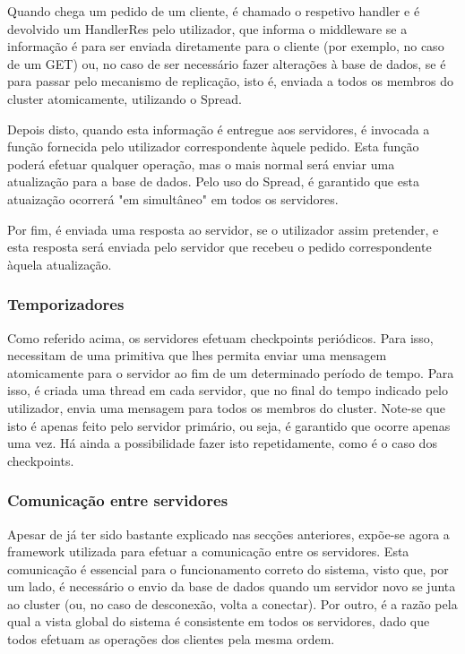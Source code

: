 \documentclass[a4paper]{report}
\begin{document}
{				Quando chega um pedido de um cliente, é chamado o respetivo handler e é devolvido um HandlerRes pelo utilizador, que informa o middleware se a informação é para ser enviada diretamente para o cliente (por exemplo, no caso de um GET) ou, no caso de ser necessário fazer alterações à base de dados, se é para passar pelo mecanismo de replicação, isto é, enviada a todos os membros do cluster atomicamente, utilizando o Spread.
				
				Depois disto, quando esta informação é entregue aos servidores, é invocada a função fornecida pelo utilizador correspondente àquele pedido. Esta função poderá efetuar qualquer operação, mas o mais normal será enviar uma atualização para a base de dados. Pelo uso do Spread, é garantido que esta atuaização ocorrerá "em simultâneo" em todos os servidores.
				
				Por fim, é enviada uma resposta ao servidor, se o utilizador assim pretender, e esta resposta será enviada pelo servidor que recebeu o pedido correspondente àquela atualização.

			\subsubsection{Temporizadores} \label{sssec:Timers}
				Como referido acima, os servidores efetuam checkpoints periódicos. Para isso, necessitam de uma primitiva que lhes permita enviar uma mensagem atomicamente para o servidor ao fim de um determinado período de tempo. Para isso, é criada uma thread em cada servidor, que no final do tempo indicado pelo utilizador, envia uma mensagem para todos os membros do cluster. Note-se que isto é apenas feito pelo servidor primário, ou seja, é garantido que ocorre apenas uma vez. Há ainda a possibilidade fazer isto repetidamente, como é o caso dos checkpoints.

			\subsubsection{Comunicação entre servidores} \label{sssec:ServerCommunication}
				Apesar de já ter sido bastante explicado nas secções anteriores, expõe-se agora a framework utilizada para efetuar a comunicação entre os servidores. Esta comunicação é essencial para o funcionamento correto do sistema, visto que, por um lado, é necessário o envio da base de dados quando um servidor novo se junta ao cluster (ou, no caso de desconexão, volta a conectar). Por outro, é a razão pela qual a vista global do sistema é consistente em todos os servidores, dado que todos efetuam as operações dos clientes pela mesma ordem.
				
}
\end{document}
